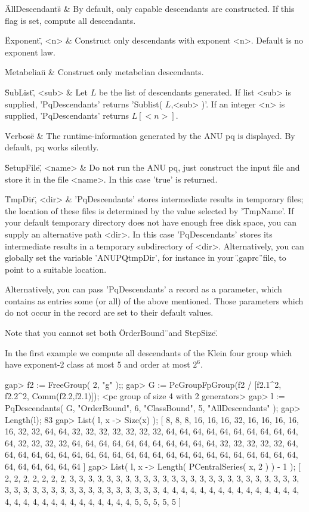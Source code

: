 \"AllDescendants\" &
    By default, only capable descendants are constructed. If this flag
    is set, compute all descendants.

\"Exponent\", <n> &
    Construct only descendants with exponent <n>.  Default is no exponent
    law.

\"Metabelian\" &
    Construct only metabelian descendants.

\"SubList\", <sub> &
    Let $L$  be  the  list of  descendants  generated.  If  list <sub> is
    supplied,  'PqDescendants'  returns  'Sublist( $L$,<sub> )'.  If   an
    integer <n> is supplied, 'PqDescendants' returns $L[<n>]$.

\"Verbose\" &
    The runtime-information  generated by  the  ANU pq is  displayed.  By
    default, pq works silently.

\"SetupFile\", <name> &
    Do not run the ANU pq, just construct  the input file and store it in
    the file <name>. In this case 'true' is returned.

\"TmpDir\", <dir> &
    'PqDescendants' stores intermediate results  in temporary  files; the
    location  of  these  files  is  determined  by the value  selected by
    'TmpName'.  If your default temporary directory does not  have enough
    free disk space,  you can supply an alternative path  <dir>.  In this
    case 'PqDescendants' stores its intermediate results  in  a temporary
    subdirectory of <dir>.
    Alternatively, you can globally set  the  variable 'ANUPQtmpDir', for
    instance in your \".gaprc\"\ file, to point to a suitable location.
\enditems

Alternatively,  you can pass 'PqDescendants'  a record  as  a  parameter,
which  contains  as  entries some (or all) of the above mentioned.  Those
parameters  which do not occur  in  the record are  set  to their default
values.

Note that you cannot set both \"OrderBound\"\ and \"StepSize\".

In the first example  we  compute all descendants of the Klein four group
which have exponent-2 class at most 5 and order at most $2^6$.

\beginexample
    gap> f2 := FreeGroup( 2, "g" );;                                       
    gap> G := PcGroupFpGroup(f2 / [f2.1^2, f2.2^2, Comm(f2.2,f2.1)]);
    <pc group of size 4 with 2 generators>
    gap> l := PqDescendants( G, "OrderBound", 6, "ClassBound", 5,
                                "AllDescendants" );
    gap>  Length(l);
    83
    gap>  List( l, x -> Size(x) );
    [ 8, 8, 8, 16, 16, 16, 32, 16, 16, 16, 16, 16, 32, 32, 64, 64, 32, 32, 
      32, 32, 32, 32, 32, 64, 64, 64, 64, 64, 64, 64, 64, 64, 64, 64, 32,
      32, 32, 32, 64, 64, 64, 64, 64, 64, 64, 64, 64, 64, 64, 32, 32, 32,
      32, 32, 64, 64, 64, 64, 64, 64, 64, 64, 64, 64, 64, 64, 64, 64, 64,
      64, 64, 64, 64, 64, 64, 64, 64, 64, 64, 64, 64, 64, 64 ]
    gap>  List( l, x -> Length( PCentralSeries( x, 2 ) ) - 1 );
    [ 2, 2, 2, 2, 2, 2, 2, 3, 3, 3, 3, 3, 3, 3, 3, 3, 3, 3, 3, 3, 3, 3, 3,
      3, 3, 3, 3, 3, 3, 3, 3, 3, 3, 3, 3, 3, 3, 3, 3, 3, 3, 3, 3, 3, 3, 3,
      3, 3, 3, 4, 4, 4, 4, 4, 4, 4, 4, 4, 4, 4, 4, 4, 4, 4, 4, 4, 4, 4, 4,
      4, 4, 4, 4, 4, 4, 4, 4, 4, 5, 5, 5, 5, 5 ]
\endexample

